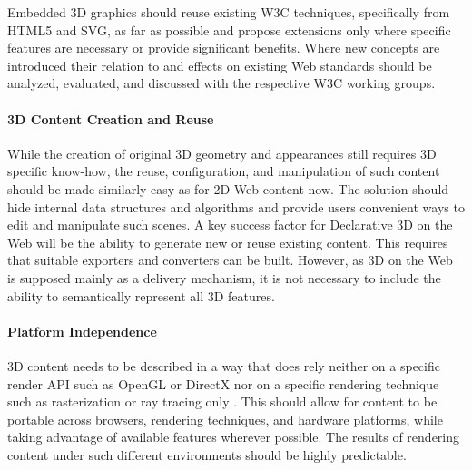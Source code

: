 \documentclass{acmsiggraph}
\begin{document}
Embedded 3D graphics should reuse existing W3C techniques, specifically from HTML5 and SVG, as far as possible and propose extensions only where specific features are necessary or provide significant benefits. Where new concepts are introduced their relation to and effects on existing Web standards should be analyzed, evaluated, and discussed with the respective W3C working groups.

\paragraph{3D Content Creation and Reuse}
While the creation of original 3D geometry and appearances still requires 3D specific know-how, the reuse, configuration, and manipulation of such content should be made similarly easy as for 2D Web content now. The solution should hide internal data structures and algorithms and provide users convenient ways to edit and manipulate such scenes.
A key success factor for Declarative 3D on the Web will be the ability to generate new or reuse existing content. This requires that suitable exporters and converters can be built. However, as 3D on the Web is supposed mainly as a delivery mechanism, it is not necessary to include the ability to semantically represent all 3D features.

\paragraph{Platform Independence}
3D content needs to be described in a way that does rely neither on a specific render API such as OpenGL or DirectX nor on a specific rendering technique such as rasterization or ray tracing only \cite{Rubinstein:2009,Schwenk12}. This should allow for content to be portable across browsers, rendering techniques, and hardware platforms, while taking advantage of available features wherever possible. The results of rendering content under such different environments should be highly predictable.
\end{document}
